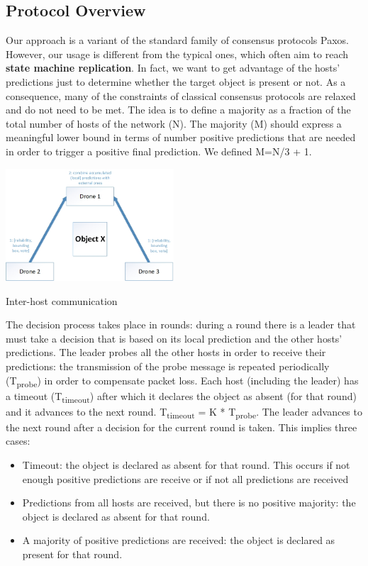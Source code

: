 \documentclass[10pt,conference,compsocconf]{IEEEtran}
\begin{document}
\subsection{Protocol Overview}
\label{subsec:protooverview}
Our approach is a variant of the standard family of consensus protocols Paxos. However, our usage is different from the typical ones, which often aim to reach \textbf{state machine replication}. In fact, we want to get advantage of the hosts' predictions just to determine whether the target object is present or not. As a consequence, many of the constraints of classical consensus protocols are relaxed and do not need to be met. The idea is to define a majority as a fraction of the total number of hosts of the network (N). The majority (M) should express a meaningful lower bound in terms of number positive predictions that are needed in order to trigger a positive final prediction. We defined M=N/3 + 1.
\begin{center}
	\captionsetup{type=figure}
	\includegraphics[width=0.47\textwidth]{img/protocol_sketch_inter_host.jpg}
	\caption {Inter-host communication}
	\label{fig:inter_host}
\end{center}
The decision process takes place in rounds: during a round there is a leader that must take a decision that is based on its local prediction and the other hosts' predictions. The leader probes all the other hosts in order to receive their predictions: the transmission of the probe message is repeated periodically (T\textsubscript{probe}) in order to compensate packet loss. Each host (including the leader) has a timeout (T\textsubscript{timeout}) after which it declares the object as absent (for that round) and it advances to the next round. T\textsubscript{timeout} = K * T\textsubscript{probe}. The leader advances to the next round after a decision for the current round is taken. This implies three cases:
\begin{itemize}
\item Timeout: the object is declared as absent for that round. This occurs if not enough positive predictions are receive or if not all predictions are received
\item Predictions from all hosts are received, but there is no positive majority: the object is declared as absent for that round.
\item A majority of positive predictions are received: the object is declared as present for that round.
\end{itemize}
\end{document}
